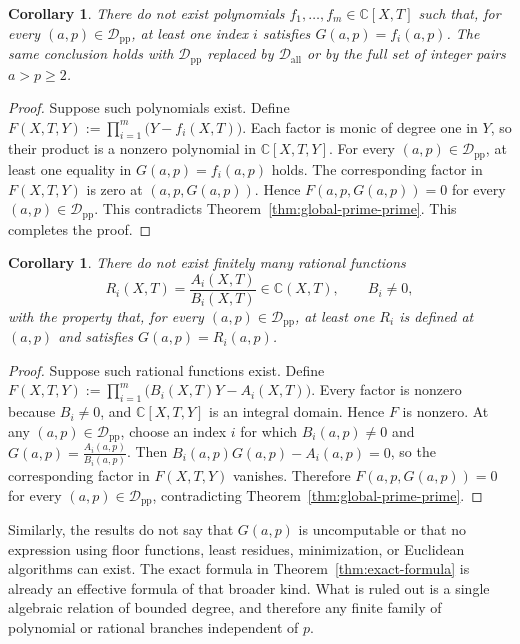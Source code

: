 \documentclass[reqno, 12pt]{article}
\numberwithin{equation}{section}
\newtheorem{corollary}[theorem]{Corollary}
\theoremstyle{definition}
\newcommand{\CC}{\mathbb{C}}
\newcommand{\cD}{\mathcal D}
\begin{document}
\begin{corollary}\label{cor:no-finite-poly-reduced}
There do not exist polynomials
$f_1,\ldots,f_m\in\CC[X,T]$ such that, for every $(a,p)\in\cD_{\mathrm{pp}}$, at least one index $i$ satisfies $G(a,p)=f_i(a,p)$.
The same conclusion holds with $\cD_{\mathrm{pp}}$ replaced by $\cD_{\mathrm{all}}$ or by the full set of integer pairs $a>p\ge2$.
\end{corollary}
\begin{proof}
Suppose such polynomials exist. Define $F(X,T,Y):=\prod_{i=1}^m\bigl(Y-f_i(X,T)\bigr)$.
Each factor is monic of degree one in $Y$, so their product is a nonzero
polynomial in $\CC[X,T,Y]$.  For every $(a,p)\in\cD_{\mathrm{pp}}$, at least
one equality in $G(a,p)=f_i(a,p)$ holds.  The corresponding
factor in $F(X,T,Y)$ is zero at $(a,p,G(a,p))$.  Hence $F(a,p,G(a,p))=0$ for every $(a,p)\in\cD_{\mathrm{pp}}$.  This contradicts Theorem~\ref{thm:global-prime-prime}.
This completes the proof.
\end{proof}


\begin{corollary}\label{cor:no-finite-rational}
There do not exist finitely many rational functions
\[R_i(X,T)=\frac{A_i(X,T)}{B_i(X,T)}\in\CC(X,T),\qquad B_i\ne0,
\]
with the property that, for every $(a,p)\in\cD_{\mathrm{pp}}$, at least one
$R_i$ is defined at $(a,p)$ and satisfies $G(a,p)=R_i(a,p)$.
\end{corollary}
\begin{proof}
Suppose such rational functions exist.  Define $F(X,T,Y):=\prod_{i=1}^m\bigl(B_i(X,T)Y-A_i(X,T)\bigr)$.
Every factor is nonzero because $B_i\ne0$, and $\CC[X,T,Y]$ is an integral domain.  Hence $F$ is nonzero.
At any $(a,p)\in\cD_{\mathrm{pp}}$, choose an index $i$ for which
$B_i(a,p)\ne0$ and $G(a,p)=\frac{A_i(a,p)}{B_i(a,p)}$.
Then $B_i(a,p)G(a,p)-A_i(a,p)=0$, so the corresponding factor in $F(X,T,Y)$ vanishes.
Therefore $F(a,p,G(a,p))=0$ for every $(a,p)\in\cD_{\mathrm{pp}}$, contradicting
Theorem~\ref{thm:global-prime-prime}.
\end{proof}


Similarly, the results do not say that $G(a,p)$ is uncomputable or that no expression using floor functions, least residues, minimization, or Euclidean algorithms can exist.  The exact formula in Theorem~\ref{thm:exact-formula} is already an effective formula of that broader kind.  What is ruled out is a single algebraic relation of bounded degree, and therefore any finite family
of polynomial or rational branches independent of $p$.
\end{document}
